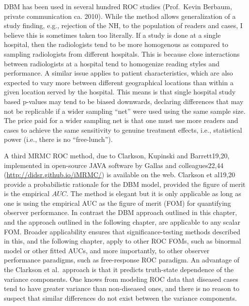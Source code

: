 \documentclass[
]{book}
\begin{document}
DBM has been used in several hundred ROC studies (Prof.~Kevin Berbaum, private communication ca. 2010). While the method allows generalization of a study finding, e.g., rejection of the NH, to the population of readers and cases, I believe this is sometimes taken too literally. If a study is done at a single hospital, then the radiologists tend to be more homogenous as compared to sampling radiologists from different hospitals. This is because close interactions between radiologists at a hospital tend to homogenize reading styles and performance. A similar issue applies to patient characteristics, which are also expected to vary more between different geographical locations than within a given location served by the hospital. This means is that single hospital study based p-values may tend to be biased downwards, declaring differences that may not be replicable if a wider sampling ``net'' were used using the same sample size. The price paid for a wider sampling net is that one must use more readers and cases to achieve the same sensitivity to genuine treatment effects, i.e., statistical power (i.e., there is no ``free-lunch'').

A third MRMC ROC method, due to Clarkson, Kupinski and Barrett19,20, implemented in open-source JAVA software by Gallas and colleagues22,44 (\url{http://didsr.github.io/iMRMC/}) is available on the web. Clarkson et al19,20 provide a probabilistic rationale for the DBM model, provided the figure of merit is the empirical \(AUC\). The method is elegant but it is only applicable as long as one is using the empirical AUC as the figure of merit (FOM) for quantifying observer performance. In contrast the DBM approach outlined in this chapter, and the approach outlined in the following chapter, are applicable to any scalar FOM. Broader applicability ensures that significance-testing methods described in this, and the following chapter, apply to other ROC FOMs, such as binormal model or other fitted AUCs, and more importantly, to other observer performance paradigms, such as free-response ROC paradigm. An advantage of the Clarkson et al.~approach is that it predicts truth-state dependence of the variance components. One knows from modeling ROC data that diseased cases tend to have greater variance than non-diseased ones, and there is no reason to suspect that similar differences do not exist between the variance components.
\end{document}

